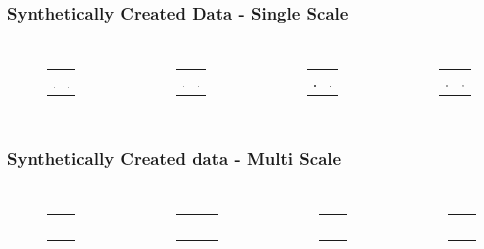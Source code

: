 \documentclass[9pt]{beamer}
\begin{document}
\begin{frame}
\frametitle{Synthetically Created Data - Single Scale}
\begin{columns}
\begin{figure}
\begin{tabular}{c c}
\includegraphics[scale=0.15]{ex2stair6_crop.eps} & \includegraphics[scale=0.135]{ex2stair6ideal.eps}

\end{tabular}
\end{figure}
\begin{figure}
\begin{tabular}{c c}
\includegraphics[scale=0.15]{ex2stair20_crop.eps} & \includegraphics[scale=0.135]{ex2stair20ideal.eps}

\end{tabular}
\end{figure}
\begin{figure}	
\begin{tabular}{c c}
\includegraphics[scale=0.135]{cubevolume.eps}&\includegraphics[scale=0.135]{cubevolumeideal.eps}
\end{tabular}
\end{figure}
\begin{figure}	
\begin{tabular}{c c}
\includegraphics[scale=0.135]{star.eps}&\includegraphics[scale=0.135]{starideal.eps}
\end{tabular}

\end{figure}

\end{columns}
\end{frame}	
\begin{frame}
\frametitle{Synthetically Created data - Multi Scale}
\begin{columns}
\begin{figure}
\begin{tabular}{cc}

\includegraphics[scale=0.15]{multi.eps} & \includegraphics[scale=0.15]{multiideal.eps}

\end{tabular}
\end{figure}
\begin{figure}
\begin{tabular}{c c c}

\includegraphics[scale=0.19]{multirot.eps} & &\includegraphics[scale=0.19]{multiidealrot.eps}

\end{tabular}
\end{figure}
\begin{figure}
\begin{tabular}{cc}

\includegraphics[scale=0.15]{sphere1.eps} & \includegraphics[scale=0.15]{sphereideal.eps}

\end{tabular}
\end{figure}
\begin{figure}
\begin{tabular}{cc}

\includegraphics[scale=0.15]{sphere_reversed.eps} & \includegraphics[scale=0.15]{sphereideal.eps}

\end{tabular}
\end{figure}
\end{columns}
\end{frame}	
\end{document}
